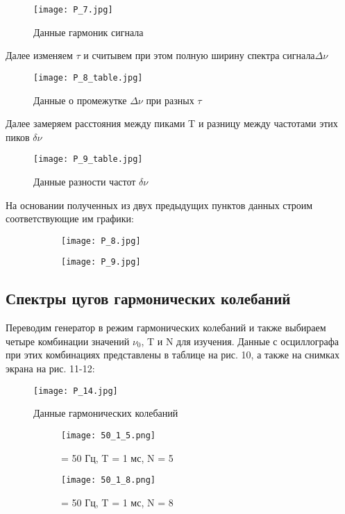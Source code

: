 \begin{figure}[h]
    \centering
    \texttt{[image: P\_7.jpg]}
    \caption{Данные гармоник сигнала}
    \label{fig:table1}
\end{figure}

Далее изменяем $\tau$ и считывем при этом полную ширину спектра сигнала$\Delta \nu$
\begin{figure}[h]
    \centering
    \texttt{[image: P\_8\_table.jpg]}
    \caption{Данные о промежутке $\Delta \nu$ при разных $\tau$}
    \label{fig:table1}
\end{figure}

Далее замеряем расстояния между пиками T и разницу между частотами этих пиков $\delta \nu$
\begin{figure}[h]
    \centering
    \texttt{[image: P\_9\_table.jpg]}
    \caption{Данные разности частот $\delta \nu$}
    \label{fig:table1}
\end{figure}

На основании полученных из двух предыдущих пунктов данных строим соответствующие им графики:
\begin{figure}{\textwidth}
\begin{subfigure}{.5\textwidth}
    \centering
    \texttt{[image: P\_8.jpg]}
    \label{fig:table1}
\end{subfigure}%
\begin{subfigure}{.5\textwidth}
    \centering
    \texttt{[image: P\_9.jpg]}
    \label{fig:table1}
\end{subfigure}
\caption{}
\end{figure}

\subsection{Спектры цугов гармонических  колебаний}

Переводим генератор в режим гармонических колебаний и также выбираем четыре комбинации значений $\nu_0$, T и N для изучения. Данные с осциллографа при этих комбинациях представлены в таблице на рис. 10, а также на снимках экрана на рис. 11-12:
\begin{figure}[h]
    \centering
    \texttt{[image: P\_14.jpg]}
    \caption{Данные гармонических колебаний}
    \label{fig:table1}
\end{figure}

\begin{figure}{\textwidth}
\begin{subfigure}{.5\textwidth}
    \centering
    \texttt{[image: 50\_1\_5.png]}
    \caption{\nu = 50 Гц, T = 1 мс, N = 5}
    \label{fig:table1}
\end{subfigure}%
\begin{subfigure}{.5\textwidth}
    \centering
    \texttt{[image: 50\_1\_8.png]}
    \caption{\nu = 50 Гц, T = 1 мс, N = 8}
    \label{fig:table1}
\end{subfigure}
\caption{}
\end{figure}

